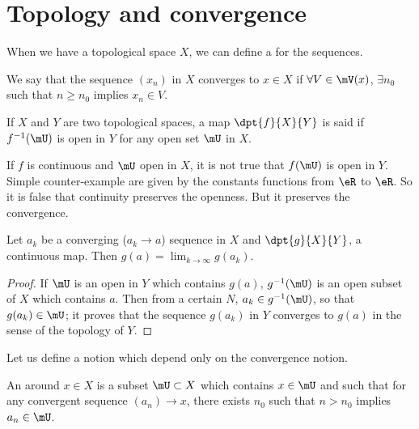 \section{Topology and convergence}

When we have a topological space $X$, we can define a  for the sequences.

\begin{definition}
We say that the sequence $(x_n)$ in $X$ converges to $x\in X$ if
$\forall V\in\mV(x)$, $\exists n_0$ such that $n\geq n_0$ implies $x_n\in V$. \label{def:convergence}
\end{definition}

\begin{definition}
If $X$ and $Y$ are two topological spaces, a map $\dpt{f}{X}{Y}$ is said  if $f^{-1}(\mU)$ is open in $Y$ for any open set $\mU$ in $X$.
\end{definition}

If $f$ is continuous and $\mU$ open in $X$, it is not true that $f(\mU)$ is open in $Y$. Simple counter-example are given by the constants functions from $\eR$ to $\eR$. So it is false that continuity preserves the openness. But it preserves the convergence.

\begin{proposition}
Let $a_k$ be a converging ($a_k\to a$) sequence in $X$ and $\dpt{g}{X}{Y}$, a continuous map. Then $g(a)=\lim_{k\to\infty}g(a_k)$.
\label{prop:continu_cv}
\end{proposition}
\begin{proof}
If $\mU$ is an open in $Y$ which contains $g(a)$, $g^{-1}(\mU)$ is an open subset of $X$ which contains $a$. Then from a certain $N$, $a_k\in g^{-1}(\mU)$, so that $g(a_k)\in\mU$; it proves that the sequence $g(a_k)$ in $Y$ converges to $g(a)$ in the sense of the topology of $Y$.
\end{proof}

Let us define a notion which depend only on the convergence notion.

\begin{definition}
An  around $x\in X$ is a subset $\mU\subset X$ which contains $x\in\mU$ and such that for any convergent sequence $(a_n)\to x$, there exists $n_0$ such that $n>n_0$ implies $a_n\in\mU$.
\end{definition}

